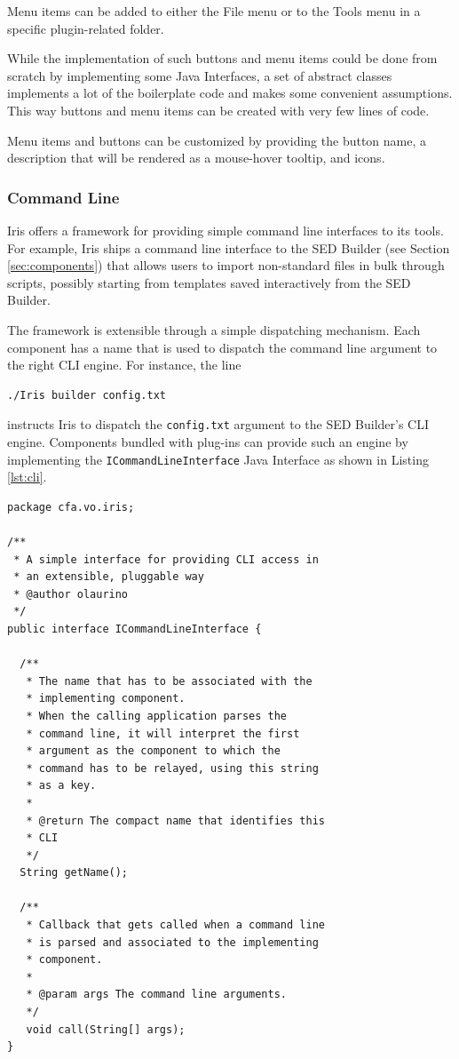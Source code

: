 \documentclass[preprint,authoryear,5p]{elsarticle}
\begin{document}
Menu items can be added to either the File menu or to the Tools menu in a
specific plugin-related folder.

While the implementation of such buttons and menu items could be done from
scratch by implementing some Java Interfaces, a set of abstract classes
implements a lot of the boilerplate code and makes some convenient assumptions.
This way buttons and menu items can be created with very few lines of code.

Menu items and buttons can be customized by providing the button name, a
description that will be rendered as a mouse-hover tooltip, and icons.

\subsubsection{Command Line} Iris offers a framework for providing simple
command line interfaces to its tools. For example, Iris ships a command line
interface to the SED Builder (see Section \ref{sec:components}) that allows
users to import non-standard files in bulk through scripts, possibly starting
from templates saved interactively from the SED Builder.

The framework is extensible through a simple dispatching mechanism. Each
component has a name that is used to dispatch the command line argument to the
right CLI engine. For instance, the line
\begin{lstlisting}[style=code]
./Iris builder config.txt
\end{lstlisting}
instructs Iris to dispatch the \verb|config.txt| argument to the SED Builder's
CLI engine. Components bundled with plug-ins can provide such an engine by implementing the
\verb|ICommandLineInterface| Java Interface as shown in Listing \ref{lst:cli}.


\begin{lstlisting}[style=java,
	caption={Every Iris component can expose a command line interface. Iris dispatches the command line arguments for the relative component to process. This code is written in Java.},
	label=lst:cli]
package cfa.vo.iris;

/**
 * A simple interface for providing CLI access in 
 * an extensible, pluggable way
 * @author olaurino
 */
public interface ICommandLineInterface {

  /**
   * The name that has to be associated with the
   * implementing component.
   * When the calling application parses the 
   * command line, it will interpret the first
   * argument as the component to which the 
   * command has to be relayed, using this string
   * as a key.
   *
   * @return The compact name that identifies this
   * CLI
   */
  String getName();

  /**
   * Callback that gets called when a command line 
   * is parsed and associated to the implementing 
   * component.
   *
   * @param args The command line arguments.
   */
   void call(String[] args);
}
\end{lstlisting}
\end{document}
